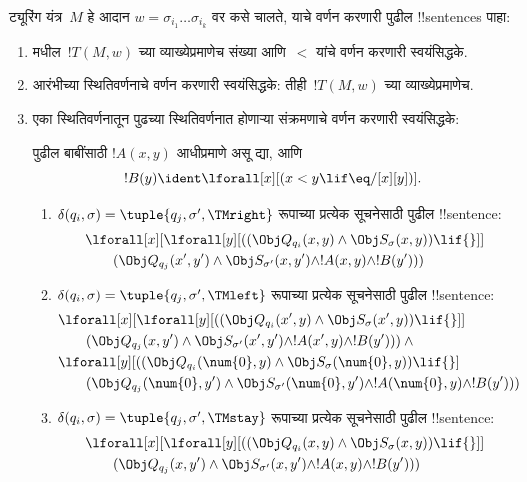 \documentclass[../../../include/open-logic-section]{subfiles}
\begin{document}
ट्यूरिंग यंत्र~$M$ हे
आदान $w = \sigma_{i_1}\dots\sigma_{i_k}$
वर कसे चालते, याचे
वर्णन करणारी पुढील
!!{sentence}s पाहा:
\begin{enumerate}
\item {} मधील~$!T(M,w)$ च्या व्याख्येप्रमाणेच
  संख्या आणि~$<$ यांचे वर्णन करणारी स्वयंसिद्धके.
\item आरंभीच्या स्थितिवर्णनाचे
वर्णन करणारी स्वयंसिद्धके:
तीही~$!T(M,w)$
च्या व्याख्येप्रमाणेच.
\item एका स्थितिवर्णनातून
पुढच्या स्थितिवर्णनात
होणाऱ्या संक्रमणाचे
वर्णन करणारी स्वयंसिद्धके:

पुढील बाबींसाठी $!A(x, y)$
आधीप्रमाणे असू द्या,
आणि
\[
  !B(y) \ident \lforall[x][(x < y \lif \eq/[x][y])].
\]
\begin{enumerate}
\item {}
$\delta(q_i, \sigma) =
  \tuple{q_j, \sigma', \TMright}$
रूपाच्या प्रत्येक सूचनेसाठी
पुढील !!{sentence}:
\begin{align*}
& \lforall[x][\lforall[y][(
   (\Obj Q_{q_i}(x, y) \land \Obj S_{\sigma}(x, y)) \lif {}]] \\
&\qquad   (\Obj Q_{q_j}(x', y') \land \Obj S_{\sigma'}(x, y') \land
!A(x, y) \land !B(y')))
\end{align*}
\item {}
$\delta(q_i, \sigma) =
  \tuple{q_j, \sigma', \TMleft}$
रूपाच्या प्रत्येक सूचनेसाठी
पुढील !!{sentence}:
\begin{align*}
& \lforall[x][\lforall[y][
    ((\Obj Q_{q_i}(x', y) \land \Obj S_{\sigma}(x', y)) \lif {}]]\\
& \qquad   (\Obj Q_{q_j}(x, y') \land \Obj S_{\sigma'}(x', y') \land
!A(x', y) \land !B(y'))) \land {}\\
& \lforall[y][((\Obj Q_{q_i}(\num{0}, y) \land \Obj S_{\sigma}(\num{0},
    y)) \lif {}]\\
& \qquad (\Obj Q_{q_j}(\num{0}, y') \land \Obj S_{\sigma'}(\num{0},
  y') \land !A(\num{0}, y) \land !B(y')))
\end{align*}
\item {}
$\delta(q_i, \sigma) =
  \tuple{q_j, \sigma', \TMstay}$
रूपाच्या प्रत्येक सूचनेसाठी
पुढील !!{sentence}:
\begin{align*}
& \lforall[x][\lforall[y][(
   (\Obj Q_{q_i}(x, y) \land \Obj S_{\sigma}(x, y)) \lif {}]] \\
&\qquad (\Obj Q_{q_j}(x, y') \land \Obj S_{\sigma'}(x, y') \land
!A(x, y) \land !B(y')))
\end{align*}

\end{enumerate}
\end{enumerate}
\end{document}
